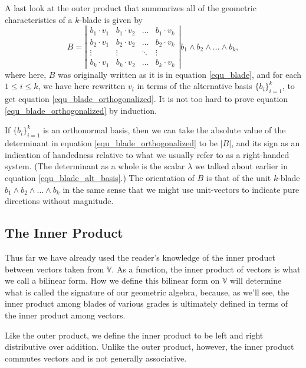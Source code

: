 \documentclass[12pt]{article}
\newcommand{\V}{\mathbb{V}}
\begin{document}
A last look at the outer product that summarizes all of the geometric characteristics of a $k$-blade
is given by
\begin{equation}\label{equ_blade_orthogonalized}
B = \left|\begin{array}{cccc}
b_1\cdot v_1 & b_1\cdot v_2 & \dots & b_1\cdot v_k \\
b_2\cdot v_1 & b_2\cdot v_2 & \dots & b_2\cdot v_k \\
\vdots & \vdots & \ddots & \vdots \\
b_k\cdot v_1 & b_k\cdot v_2 & \dots & b_k\cdot v_k
\end{array}\right|b_1\wedge b_2\wedge\dots\wedge b_k,
\end{equation}
where here, $B$ was originally written as it is in equation \eqref{equ_blade}, and
for each $1\leq i\leq k$, we have here rewritten $v_i$ in terms of the alternative basis $\{b_i\}_{i=1}^k$,
to get equation \eqref{equ_blade_orthogonalized}.  It is not too hard to
prove equation \eqref{equ_blade_orthogonalized} by induction.

If $\{b_i\}_{i=1}^k$ is an orthonormal basis,
then we can take the absolute value of the determinant in equation
\eqref{equ_blade_orthogonalized} to be $|B|$, and its sign as an
indication of handedness relative to what we usually refer to as a right-handed system.
(The determinant as a whole is the scalar $\lambda$ we talked about earlier in
equation \eqref{equ_blade_alt_basis}.)
The orientation of $B$ is that of the unit $k$-blade $b_1\wedge b_2\wedge\dots\wedge b_k$
in the same sense that we might use unit-vectors to indicate pure directions without magnitude.

\subsection{The Inner Product}

Thus far we have already used the reader's knowledge of the inner product
between vectors taken from $\V$.  As a function, the inner product of vectors is
what we call a bilinear form.  How we define this bilinear form on $\V$ will determine
what is called the signature of our geometric algebra, because, as we'll see,
the inner product among blades of various grades is ultimately defined
in terms of the inner product among vectors.

Like the outer product, we define the inner product to be left and
right distributive over addition.  Unlike the outer product, however,
the inner product commutes vectors and is not generally associative.
\end{document}
